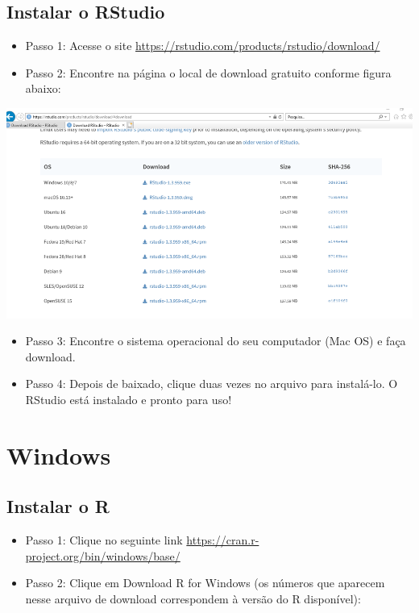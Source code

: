 \documentclass[
  10pt,
  brazil,
  a4paper,
  twoside, notitlepage, openright]{book}
\providecommand{\tightlist}{%
  \setlength{\itemsep}{0pt}\setlength{\parskip}{0pt}}
\begin{document}
\hypertarget{instalar-o-rstudio-1}{%
\subsection{Instalar o RStudio}\label{instalar-o-rstudio-1}}

\begin{itemize}
\tightlist
\item
  Passo 1: Acesse o site \url{https://rstudio.com/products/rstudio/download/}\\
\item
  Passo 2: Encontre na página o local de download gratuito conforme figura abaixo:
\end{itemize}

\includegraphics[width=13.54in]{img/inst_1_rstudio}

\begin{itemize}
\tightlist
\item
  Passo 3: Encontre o sistema operacional do seu computador (Mac OS) e faça download.\\
\item
  Passo 4: Depois de baixado, clique duas vezes no arquivo para instalá-lo. O RStudio está instalado e pronto para uso!
\end{itemize}

\hypertarget{windows}{%
\section{Windows}\label{windows}}

\hypertarget{instalar-o-r-2}{%
\subsection{Instalar o R}\label{instalar-o-r-2}}

\begin{itemize}
\tightlist
\item
  Passo 1: Clique no seguinte link \url{https://cran.r-project.org/bin/windows/base/}\\
\item
  Passo 2: Clique em Download R for Windows (os números que aparecem nesse arquivo de download correspondem à versão do R disponível):
\end{itemize}
\end{document}
